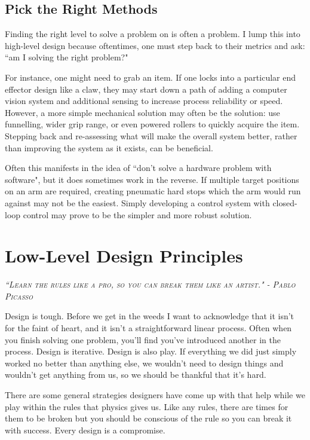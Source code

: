 \section{Pick the Right Methods}

Finding the right level to solve a problem on is often a problem. I lump this into high-level design because oftentimes, one must step back to their metrics and ask: ``am I solving the right problem?"

For instance, one might need to grab an item. If one locks into a particular end effector design like a claw, they may start down a path of adding a computer vision system and additional sensing to increase process reliability or speed. However, a more simple mechanical solution may often be the solution: use funnelling, wider grip range, or even powered rollers to quickly acquire the item. Stepping back and re-assessing what will make the overall system better, rather than improving the system as it exists, can be beneficial.

Often this manifests in the idea of ``don't solve a hardware problem with software", but it does sometimes work in the reverse. If multiple target positions on an arm are required, creating pneumatic hard stops which the arm would run against may not be the easiest. Simply developing a control system with closed-loop control may prove to be the simpler and more robust solution.



\chapter{Low-Level Design Principles}

 {\slshape \scshape ``Learn the rules like a pro, so you can break them like an artist." - Pablo Picasso}
 
Design is tough. Before we get in the weeds I want to acknowledge that it isn't for the faint of heart, and it isn't a straightforward linear process. Often when you finish solving one problem, you'll find you've introduced another in the process. Design is iterative. Design is also play. If everything we did just simply worked no better than anything else, we wouldn't need to design things and wouldn't get anything from us, so we should be thankful that it's hard.

There are some general strategies designers have come up with that help while we play within the rules that physics gives us. Like any rules, there are times for them to be broken but you should be conscious of the rule so you can break it with success. Every design is a compromise.

